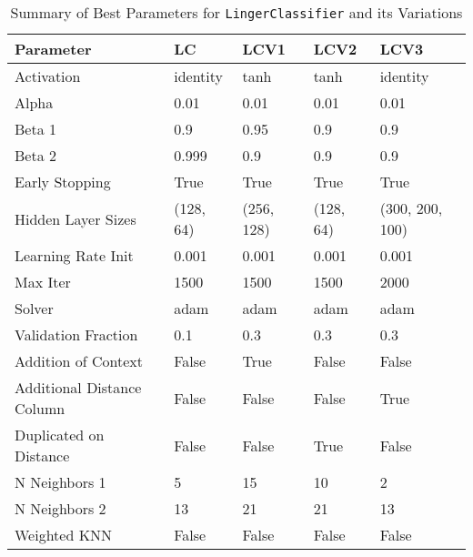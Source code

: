 \documentclass[a4paper, 12pt]{report}
\begin{document}
\begin{table}[H]
    \centering
    \caption{Summary of Best Parameters for \texttt{LingerClassifier} and its Variations}
    \label{tab:best_parameters_summary_exp3}
    \begin{tabular}{|l|l|l|l|l|}
    \hline
    \textbf{Parameter} & \textbf{LC} & \textbf{LCV1} & \textbf{LCV2} & \textbf{LCV3} \\
    \hline
    Activation & identity & tanh & tanh & identity \\
    Alpha & 0.01 & 0.01 & 0.01 & 0.01 \\
    Beta 1 & 0.9 & 0.95 & 0.9 & 0.9 \\
    Beta 2 & 0.999 & 0.9 & 0.9 & 0.9 \\
    Early Stopping & True & True & True & True \\
    Hidden Layer Sizes & (128, 64) & (256, 128) & (128, 64) & (300, 200, 100) \\
    Learning Rate Init & 0.001 & 0.001 & 0.001 & 0.001 \\
    Max Iter & 1500 & 1500 & 1500 & 2000 \\
    Solver & adam & adam & adam & adam \\
    Validation Fraction & 0.1 & 0.3 & 0.3 & 0.3 \\
    Addition of Context & False & True & False & False \\
    Additional Distance Column & False & False & False & True \\
    Duplicated on Distance & False & False & True & False \\
    N Neighbors 1 & 5 & 15 & 10 & 2 \\
    N Neighbors 2 & 13 & 21 & 21 & 13 \\
    Weighted KNN & False & False & False & False \\
    \hline
    \end{tabular}
\end{table}
\end{document}
